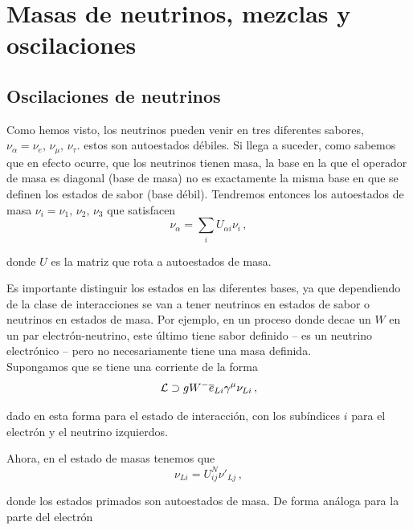 \chapter{Masas de neutrinos, mezclas y oscilaciones}


\section{Oscilaciones de neutrinos}

Como hemos visto, los neutrinos pueden venir en tres diferentes sabores, $\nu_\alpha = \nu_e,\, \nu_\mu,\, \nu_\tau$. estos son autoestados débiles. Si llega a suceder, como sabemos que en efecto ocurre, que los neutrinos tienen masa, la base en la que el operador de masa es diagonal (base de masa) no es exactamente la misma base en que se definen los estados de sabor (base débil). Tendremos entonces los autoestados de masa $\nu_i = \nu_1,\, \nu_2,\, \nu_3$ que satisfacen
%
\begin{equation}
	\nu_\alpha = \sum_i U_{\alpha i} \nu_i \,,
\end{equation}

\noindent donde $U$ es la matriz que rota a autoestados de masa.

Es importante distinguir los estados en las diferentes bases, ya que dependiendo de la clase de interacciones se van a tener neutrinos en estados de sabor o neutrinos en estados de masa. Por ejemplo, en un proceso donde decae un $W$ en un par electrón-neutrino, este último tiene sabor definido -- es un neutrino electrónico -- pero no necesariamente tiene una masa definida.\\

Supongamos que se tiene una corriente de la forma
%
\begin{equation}
	\mathcal{L} \supset g W^- \overline{e}_{Li} \gamma^\mu \nu_{Li} \,,
\label{eq:mneutr_corr1}
\end{equation}

\noindent dado en esta forma para el estado de interacción, con los subíndices $i$ para el electrón y el neutrino izquierdos.

Ahora, en el estado de masas tenemos que
%
\begin{equation}
	\nu_{Li} = U^N_{ij} \nu'_{Lj} \,,
\end{equation}

\noindent donde los estados primados son autoestados de masa. De forma análoga para la parte del electrón
%

